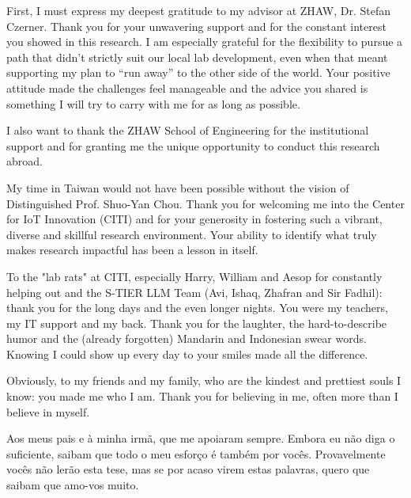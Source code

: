 First, I must express my deepest gratitude to my advisor at ZHAW, Dr. Stefan Czerner. 
Thank you for your unwavering support and for the constant interest you showed in this research. 
I am especially grateful for the flexibility to pursue a path that didn't strictly suit our local 
lab development, even when that meant supporting my plan to ``run away'' to the other side of 
the world. Your positive attitude made the challenges feel manageable and the advice you shared 
is something I will try to carry with me for as long as possible.

I also want to thank the ZHAW School of Engineering for the institutional support and for granting 
me the unique opportunity to conduct this research abroad.

My time in Taiwan would not have been possible without the vision of Distinguished Prof. Shuo-Yan Chou. 
Thank you for welcoming me into the Center for IoT Innovation (CITI) and for your generosity in fostering 
such a vibrant, diverse and skillful research environment. Your ability to identify what truly makes research 
impactful has been a lesson in itself.

To the "lab rats" at CITI, especially Harry, William and Aesop for constantly helping out and the 
S-TIER LLM Team (Avi, Ishaq, Zhafran and Sir Fadhil): thank you for the long days and the even 
longer nights. You were my teachers, my IT support and my back. Thank you for the laughter, the 
hard-to-describe humor and the (already forgotten) Mandarin and Indonesian swear words. Knowing 
I could show up every day to your smiles made all the difference.

Obviously, to my friends and my family, who are the kindest and prettiest souls I know: you made me who I am. 
Thank you for believing in me, often more than I believe in myself.

Aos meus pais e à minha irmã, que me apoiaram sempre. Embora eu não diga o suficiente, saibam que todo o 
meu esforço é também por vocês. Provavelmente vocês não lerão esta tese, mas se por acaso virem estas palavras, 
quero que saibam que amo-vos muito.


\cleardoublepage
{}
\setcounter{tocdepth}{2}
\renewcommand\contentsname{Table of Contents}
\tableofcontents


